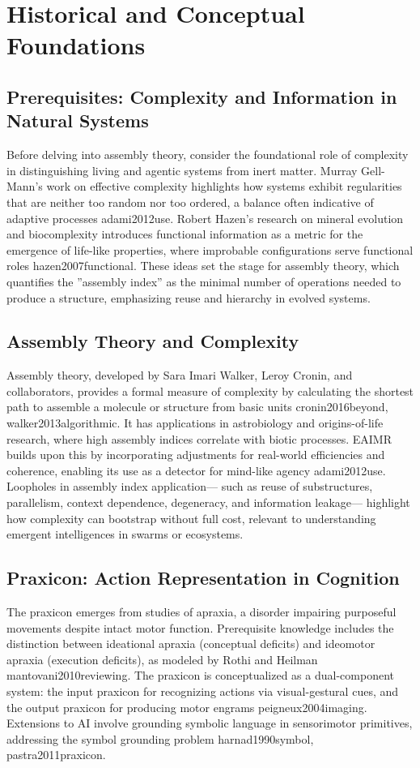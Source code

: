 \documentclass{article}
\begin{document}
\section{Historical and Conceptual Foundations}
\label{sec:foundations}

\subsection{Prerequisites: Complexity and Information in Natural Systems}
Before delving into assembly theory, consider the foundational role of complexity in distinguishing living
and agentic systems from inert matter. Murray Gell-Mann’s work on effective complexity highlights how
systems exhibit regularities that are neither too random nor too ordered, a balance often indicative of
adaptive processes {adami2012use}. Robert Hazen’s research on mineral evolution and biocomplexity introduces functional
information as a metric for the emergence of life-like properties, where improbable configurations serve
functional roles {hazen2007functional}. These ideas set the stage for assembly theory, which quantifies the ”assembly index”
as the minimal number of operations needed to produce a structure, emphasizing reuse and hierarchy in
evolved systems.

\subsection{Assembly Theory and Complexity}
Assembly theory, developed by Sara Imari Walker, Leroy Cronin, and collaborators, provides a formal
measure of complexity by calculating the shortest path to assemble a molecule or structure from basic units
{cronin2016beyond, walker2013algorithmic}. It has applications in astrobiology and origins-of-life research, where high assembly indices correlate
with biotic processes. EAIMR builds upon this by incorporating adjustments for real-world efficiencies and
coherence, enabling its use as a detector for mind-like agency {adami2012use}. Loopholes in assembly index application—
such as reuse of substructures, parallelism, context dependence, degeneracy, and information leakage—
highlight how complexity can bootstrap without full cost, relevant to understanding emergent intelligences
in swarms or ecosystems.

\subsection{Praxicon: Action Representation in Cognition}
The praxicon emerges from studies of apraxia, a disorder impairing purposeful movements despite intact
motor function.
Prerequisite knowledge includes the distinction between ideational apraxia (conceptual
deficits) and ideomotor apraxia (execution deficits), as modeled by Rothi and Heilman {mantovani2010reviewing}. The praxicon is
conceptualized as a dual-component system: the input praxicon for recognizing actions via visual-gestural
cues, and the output praxicon for producing motor engrams {peigneux2004imaging}. Extensions to AI involve grounding symbolic
language in sensorimotor primitives, addressing the symbol grounding problem {harnad1990symbol, pastra2011praxicon}.
\end{document}
